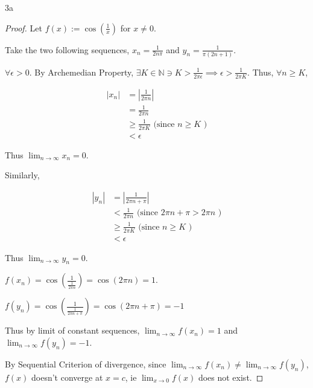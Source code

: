 \documentclass{article}
\newcommand{\N}{\mathbb{N}}
\newcommand{\abs}[1]{\left\lvert #1\right\rvert}
\begin{document}
\begin{PROB}{3a}\label{Problem 3a.}
\end{PROB}
\begin{proof}
    Let $f(x) := \cos(\frac{1}{x})$ for $x \neq 0$.  

    Take the two following sequences, $x_n = \frac{1}{2n \pi}$ and $y_n = \frac{1}{\pi(2n + 1)}$.

    $\forall \epsilon > 0$. By Archemedian Property, $\exists K \in \N \ni K > \frac{1}{2 \pi \epsilon}\implies \epsilon > \frac{1}{2 \pi K}$. Thus, $\forall n \geq K$,  

    \begin{align*}
        \abs{x_n} &= \abs{\frac{1}{2 \pi n}}  \\
        &= \frac{1}{2 \pi n} \\
        &\geq \frac{1}{2 \pi K} \text{ (since $n \geq K$ )} \\
        &< \epsilon
    \end{align*}

    Thus $\lim_{n \to \infty} x_n = 0$.
    
    Similarly,

    \begin{align*}
        \abs{y_n} &= \abs{\frac{1}{2 \pi n + \pi}}  \\
        &< \frac{1}{2 \pi n} \text{ (since $2 \pi n + \pi > 2 \pi n $ )} \\
        &\geq \frac{1}{2 \pi K} \text{ (since $n \geq K$ )} \\
        &< \epsilon
    \end{align*}


    Thus $\lim_{n \to \infty} y_n = 0$.

    $f(x_n) = \cos\left(\frac{1}{\frac{1}{2 \pi n}}\right) = \cos(2 \pi n) = 1$. 
    
    $f(y_n) = \cos\left(\frac{1}{\frac{1}{2 \pi n + \pi}}\right) = \cos(2 \pi n + \pi) = -1$  


    Thus by limit of constant sequences, $\lim_{n \to \infty} f(x_n) = 1$ and $\lim_{n \to \infty} f(y_n) = -1$. 
    
    By Sequential Criterion of divergence, since $\lim_{n \to \infty} f(x_n) \neq \lim_{n \to \infty} f(y_n)$, $f(x)$ doesn't converge at $x = c$, ie $\lim_{x \to 0} f(x)$ does not exist.     
\end{proof}
\end{document}
